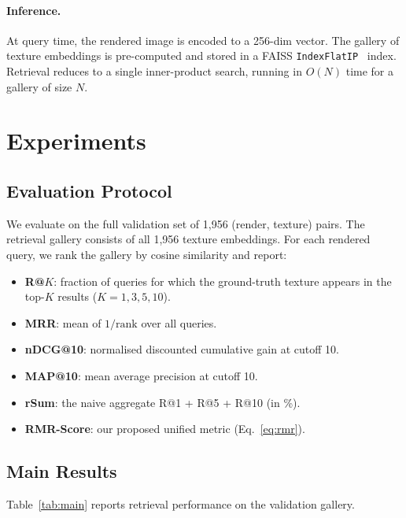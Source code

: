 \documentclass[10pt,twocolumn]{article}
\begin{document}
\paragraph{Inference.}
At query time, the rendered image is encoded to a 256-dim vector.
The gallery of texture embeddings is pre-computed and stored in a FAISS
\texttt{IndexFlatIP}~\cite{johnson2021faiss} index.
Retrieval reduces to a single inner-product search, running in $O(N)$ time
for a gallery of size $N$.

\section{Experiments}

\subsection{Evaluation Protocol}

We evaluate on the full validation set of 1,956 (render, texture) pairs.
The retrieval gallery consists of all 1,956 texture embeddings.
For each rendered query, we rank the gallery by cosine similarity and report:
\begin{itemize}[leftmargin=*,itemsep=0pt]
  \item \textbf{R@$K$}: fraction of queries for which the
        ground-truth texture appears in the top-$K$ results ($K = 1, 3, 5, 10$).
  \item \textbf{MRR}: mean of $1/\text{rank}$ over all queries.
  \item \textbf{nDCG@10}: normalised discounted cumulative gain at cutoff 10.
  \item \textbf{MAP@10}: mean average precision at cutoff 10.
  \item \textbf{rSum}: the naive aggregate R@1 + R@5 + R@10 (in \%).
  \item \textbf{RMR-Score}: our proposed unified metric (Eq.~\ref{eq:rmr}).
\end{itemize}

\subsection{Main Results}

Table~\ref{tab:main} reports retrieval performance on the validation gallery.
\end{document}
